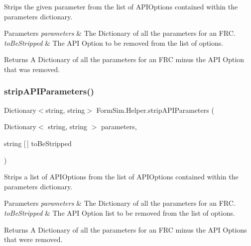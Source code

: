 Strips the given parameter from the list of A\+P\+I\+Options contained within the parameters dictionary. 


\begin{DoxyParams}{Parameters}
{\em parameters} & The Dictionary of all the parameters for an F\+RC.\\
\hline
{\em to\+Be\+Stripped} & The A\+PI Option to be removed from the list of options.\\
\hline
\end{DoxyParams}
\begin{DoxyReturn}{Returns}
A Dictionary of all the parameters for an F\+RC minus the A\+PI Option that was removed.
\end{DoxyReturn}
\mbox{\label{class_form_sim_1_1_helper_a8a6a59356795949c64f587e9f39037f7}} 
\subsubsection{\texorpdfstring{strip\+A\+P\+I\+Parameters()}{stripAPIParameters()}\hspace{0.1cm}{\footnotesize\ttfamily [2/2]}}
{\footnotesize\ttfamily Dictionary$<$string, string$>$ Form\+Sim.\+Helper.\+strip\+A\+P\+I\+Parameters (\begin{DoxyParamCaption}\item[{Dictionary$<$ string, string $>$}]{parameters,  }\item[{string \mbox{[}$\,$\mbox{]}}]{to\+Be\+Stripped }\end{DoxyParamCaption})\hspace{0.3cm}{\ttfamily [inline]}}



Strips a list of A\+P\+I\+Options from the list of A\+P\+I\+Options contained within the parameters dictionary. 


\begin{DoxyParams}{Parameters}
{\em parameters} & The Dictionary of all the parameters for an F\+RC.\\
\hline
{\em to\+Be\+Stripped} & The A\+PI Option list to be removed from the list of options.\\
\hline
\end{DoxyParams}
\begin{DoxyReturn}{Returns}
A Dictionary of all the parameters for an F\+RC minus the A\+PI Options that were removed.
\end{DoxyReturn}


